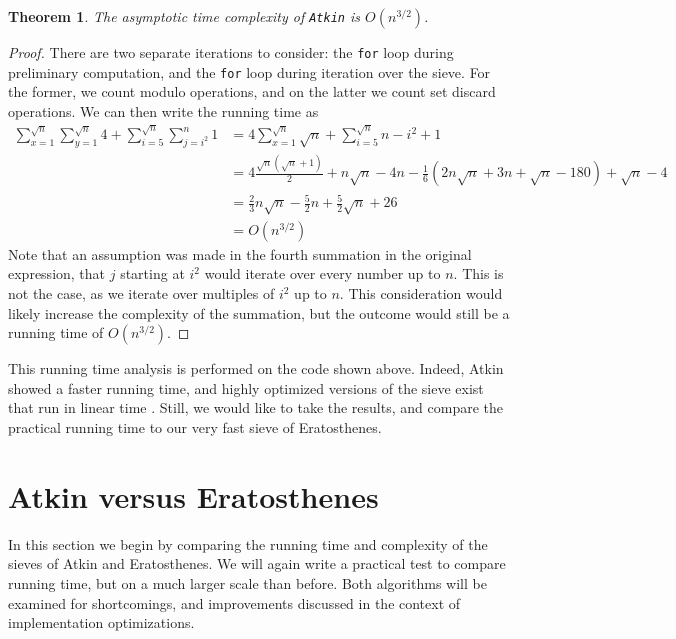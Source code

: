 \documentclass{amsart}
\newtheorem{thm}{Theorem}
\theoremstyle{definition}
\theoremstyle{case}
\begin{document}
	\begin{thm}
		The asymptotic time complexity of \texttt{Atkin} is $O(n^{3/2})$.
	\end{thm}
	\begin{proof}
		There are two separate iterations to consider: the \texttt{for} loop during preliminary computation, and the \texttt{for} loop during iteration over the sieve. For the former, we count modulo operations, and on the latter we count set discard operations. We can then write the running time as
		\begin{equation*}
		\begin{split}
		\sum_{x=1}^{\sqrt{n}} \sum_{y=1}^{\sqrt{n}} 4 + \sum_{i=5}^{\sqrt{n}} \sum_{j=i^2}^{n} 1 & = 4 \sum_{x=1}^{\sqrt{n}} \sqrt{n} + \sum_{i=5}^{\sqrt{n}} n - i^2 + 1 \\
		& = 4 \frac{\sqrt{n}(\sqrt{n}+1)}{2} + n\sqrt{n} - 4n - \frac{1}{6} (2n\sqrt{n} + 3n + \sqrt{n} - 180) + \sqrt{n} - 4 \\
		& = \frac{2}{3} n \sqrt{n} - \frac{5}{2} n + \frac{5}{2} \sqrt{n} + 26 \\
		& = O(n^{3/2})
		\end{split}
		\end{equation*}
		Note that an assumption was made in the fourth summation in the original expression, that $j$ starting at $i^2$ would iterate over every number up to $n$. This is not the case, as we iterate over multiples of $i^2$ up to $n$. This consideration would likely increase the complexity of the summation, but the outcome would still be a running time of $O(n^{3/2})$.
	\end{proof}

	This running time analysis is performed on the code shown above. Indeed, Atkin showed a faster running time, and highly optimized versions of the sieve exist that run in linear time \cite[p.~1027]{MR2031423}. Still, we would like to take the results, and compare the practical running time to our very fast sieve of Eratosthenes.
	
	
	\section{Atkin versus Eratosthenes}
	
	In this section we begin by comparing the running time and complexity of the sieves of Atkin and Eratosthenes. We will again write a practical test to compare running time, but on a much larger scale than before. Both algorithms will be examined for shortcomings, and improvements discussed in the context of implementation optimizations.
	
\end{document}
